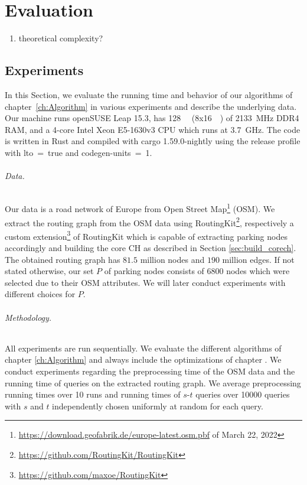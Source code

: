 
\chapter{Evaluation}
\label{ch:Evaluation}
\begin{enumerate}
	\item theoretical complexity?
\end{enumerate}

\section{Experiments}
In this Section, we evaluate the running time and behavior of our algorithms of chapter~\ref{ch:Algorithm} in various experiments and describe the underlying data. Our machine runs openSUSE Leap 15.3, has \SI{128}{\giga\byte} (8x\SI{16}{\giga\byte}) of \SI{2133}{\mega\hertz} DDR4 RAM, and a 4-core Intel Xeon E5-1630v3 CPU which runs at \SI{3.7}{\giga\hertz}. The code is written in Rust and compiled with cargo 1.59.0-nightly using the release profile with lto~=~true and codegen-units~=~1.

\subparagraph{Data.} Our data is a road network of Europe from Open Street Map\footnote{\url{https://download.geofabrik.de/europe-latest.osm.pbf} of March 22, 2022} (OSM). We extract the routing graph from the OSM data using RoutingKit\footnote{\url{https://github.com/RoutingKit/RoutingKit}}, respectively a custom extension\footnote{\url{https://github.com/maxoe/RoutingKit}} of RoutingKit which is capable of extracting parking nodes accordingly and building the core CH as described in Section \ref{sec:build_corech}. The obtained routing graph has $81.5$ million nodes and $190$ million edges. If not stated otherwise, our set $P$ of parking nodes consists of 6800 nodes which were selected due to their OSM attributes. We will later conduct experiments with different choices for $P$.

\subparagraph{Methodology.} All experiments are run sequentially. We evaluate the different algorithms of chapter \ref{ch:Algorithm} and always include the optimizations of chapter . We conduct experiments regarding the preprocessing time of the OSM data and the running time of queries on the extracted routing graph. We average preprocessing running times over 10 runs and running times of $s$-$t$ queries over \num{10000} queries with $s$ and $t$ independently chosen uniformly at random for each query.

